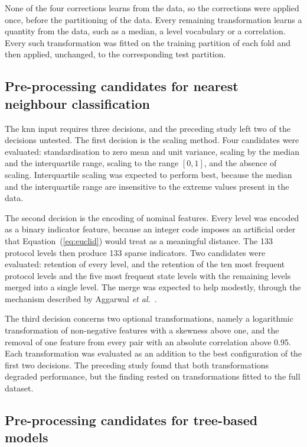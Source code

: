None of the four corrections learns from the data, so the corrections were
applied once, before the partitioning of the data. Every remaining
transformation learns a quantity from the data, such as a median, a level
vocabulary or a correlation. Every such transformation was fitted on the
training partition of each fold and then applied, unchanged, to the
corresponding test partition.

\subsection{Pre-processing candidates for nearest neighbour classification}
\label{sec:prep-knn}

The \gls{knn} input requires three decisions, and the preceding study left
two of the decisions untested. The first decision is the scaling method.
Four candidates were evaluated: standardisation to zero mean and unit
variance, scaling by the median and the interquartile range, scaling to the
range $[0, 1]$, and the absence of scaling. Interquartile scaling was
expected to perform best, because the median and the interquartile range are
insensitive to the extreme values present in the data.

The second decision is the encoding of nominal features. Every level was
encoded as a binary indicator feature, because an integer code imposes an
artificial order that Equation~(\ref{eq:euclid}) would treat as a meaningful
distance. The 133 protocol levels then produce 133 sparse indicators. Two
candidates were evaluated: retention of every level, and the retention of
the ten most frequent protocol levels and the five most frequent state levels
with the remaining levels merged into a single level. The merge was expected
to help modestly, through the mechanism described by Aggarwal
\textit{et al.}~\cite{aggarwal2001}.

The third decision concerns two optional transformations, namely a
logarithmic transformation of non-negative features with a skewness above
one, and the removal of one feature from every pair with an absolute
correlation above 0.95. Each transformation was evaluated as an addition to
the best configuration of the first two decisions. The preceding study
found that both transformations degraded performance, but the finding rested
on transformations fitted to the full dataset.

\subsection{Pre-processing candidates for tree-based models}
\label{sec:prep-tree}

